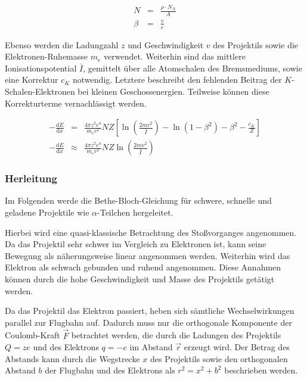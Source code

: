 \documentclass[12pt,a4paper]{scrartcl}
\numberwithin{equation}{section} %
\renewcommand{\[}{} %
\renewcommand{\]}{\noindent} %
\begin{document}
\[
\begin{eqnarray}
    N &=& \frac{\rho\cdot N_A}{A} \\
    \beta &=& \frac{v}{c}
\end{eqnarray}
\]

Ebenso werden die Ladungzahl \(z\) und Geschwindigkeit \(v\) des
Projektils sowie die Elektronen-Ruhemasse \(m_e\) verwendet. Weiterhin
sind das mittlere Ionisationspotential \(\bar I\), gemittelt über alle
Atomschalen des Bremsmediums, sowie eine Korrektur \(c_K\) notwendig.
Letztere beschreibt den fehlenden Beitrag der \(K\)-Schalen-Elektronen
bei kleinen Geschossenergien. Teilweise können diese Korrekturterme
vernachlässigt werden.

\[
\begin{eqnarray}
    -\frac{\mathrm dE}{\mathrm dx} &=&
        \frac{4\pi z^2 e^4}{m_e v^2} NZ
        \left[
            \ln\left(\frac{2mv^2}{\bar I}\right)
            - \ln\left(1 - \beta^2\right)
            - \beta^2
            - \frac{c_K}{Z}
        \right]
        \label{BetheBloch} \\
    -\frac{\mathrm dE}{\mathrm dx} &\approx&
        \frac{4\pi z^2 e^4}{m_e v^2} NZ
        \ln\left(\frac{2mv^2}{\bar I}\right)
        \label{BetheBloch2}
\end{eqnarray}
\]

\hypertarget{herleitung}{%
\subsubsection{Herleitung}\label{herleitung}}

Im Folgenden werde die Bethe-Bloch-Gleichung für schwere, schnelle und
geladene Projektile wie \(\alpha\)-Teilchen hergeleitet.

Hierbei wird eine quasi-klassische Betrachtung des Stoßvorganges
angenommen. Da das Projektil sehr schwer im Vergleich zu Elektronen ist,
kann seine Bewegung als näherungsweise linear angenommen werden.
Weiterhin wird das Elektron als schwach gebunden und ruhend angenommen.
Diese Annahmen können durch die hohe Geschwindigkeit und Masse des
Projektils getätigt werden.

Da das Projektil das Elektron passiert, heben sich sämtliche
Wechselwirkungen parallel zur Flugbahn auf. Dadurch muss nur die
orthogonale Komponente der Coulomb-Kraft \(\vec F\) betrachtet werden,
die durch die Ladungen des Projektils \(Q=ze\) und des Elektrons
\(q=-e\) im Abstand \(\vec r\) erzeugt wird. Der Betrag des Abstands
kann durch die Wegstrecke \(x\) des Projektils sowie den orthogonalen
Abstand \(b\) der Flugbahn und des Elektrons als \(r^2=x^2+b^2\)
beschrieben werden.
\end{document}
